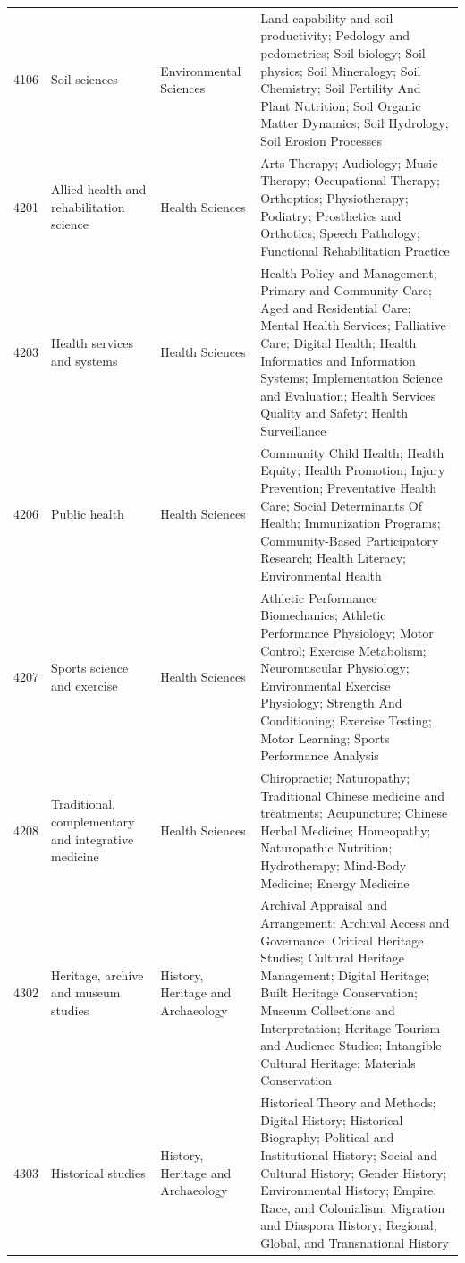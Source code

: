 \begin{longtable}{r p{2.45cm} p{2.55cm} p{6.15cm}}
4106 & Soil sciences & Environmental Sciences & Land capability and soil productivity; Pedology and pedometrics; Soil biology; Soil physics; Soil Mineralogy; Soil Chemistry; Soil Fertility And Plant Nutrition; Soil Organic Matter Dynamics; Soil Hydrology; Soil Erosion Processes \\
4201 & Allied health and rehabilitation science & Health Sciences & Arts Therapy; Audiology; Music Therapy; Occupational Therapy; Orthoptics; Physiotherapy; Podiatry; Prosthetics and Orthotics; Speech Pathology; Functional Rehabilitation Practice \\
4203 & Health services and systems & Health Sciences & Health Policy and Management; Primary and Community Care; Aged and Residential Care; Mental Health Services; Palliative Care; Digital Health; Health Informatics and Information Systems; Implementation Science and Evaluation; Health Services Quality and Safety; Health Surveillance \\
4206 & Public health & Health Sciences & Community Child Health; Health Equity; Health Promotion; Injury Prevention; Preventative Health Care; Social Determinants Of Health; Immunization Programs; Community-Based Participatory Research; Health Literacy; Environmental Health \\
4207 & Sports science and exercise & Health Sciences & Athletic Performance Biomechanics; Athletic Performance Physiology; Motor Control; Exercise Metabolism; Neuromuscular Physiology; Environmental Exercise Physiology; Strength And Conditioning; Exercise Testing; Motor Learning; Sports Performance Analysis \\
4208 & Traditional, complementary and integrative medicine & Health Sciences & Chiropractic; Naturopathy; Traditional Chinese medicine and treatments; Acupuncture; Chinese Herbal Medicine; Homeopathy; Naturopathic Nutrition; Hydrotherapy; Mind-Body Medicine; Energy Medicine \\
4302 & Heritage, archive and museum studies & History, Heritage and Archaeology & Archival Appraisal and Arrangement; Archival Access and Governance; Critical Heritage Studies; Cultural Heritage Management; Digital Heritage; Built Heritage Conservation; Museum Collections and Interpretation; Heritage Tourism and Audience Studies; Intangible Cultural Heritage; Materials Conservation \\
4303 & Historical studies & History, Heritage and Archaeology & Historical Theory and Methods; Digital History; Historical Biography; Political and Institutional History; Social and Cultural History; Gender History; Environmental History; Empire, Race, and Colonialism; Migration and Diaspora History; Regional, Global, and Transnational History \\

\end{longtable}
